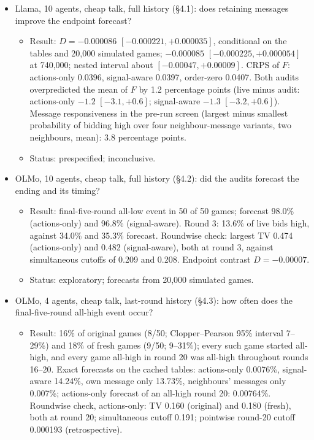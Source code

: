 \documentclass[11pt,letterpaper]{article}
\begin{document}
\begin{itemize}
  \item Llama, 10 agents, cheap talk, full history (§4.1): does retaining messages improve the endpoint forecast?
  \begin{itemize}
    \item Result: $D = -0.000086$ $[-0.000221, +0.000035]$, conditional on the tables and 20,000 simulated games; $-0.000085$ $[-0.000225, +0.000054]$ at 740,000; nested interval about $[-0.00047, +0.00009]$.
      CRPS of $F$: actions-only 0.0396, signal-aware 0.0397, order-zero 0.0407.
      Both audits overpredicted the mean of $F$ by 1.2 percentage points (live minus audit: actions-only $-1.2$ $[-3.1, +0.6]$; signal-aware $-1.3$ $[-3.2, +0.6]$).
      Message responsiveness in the pre-run screen (largest minus smallest probability of bidding high over four neighbour-message variants, two neighbours, mean): 3.8 percentage points.
    \item Status: prespecified; inconclusive.
  \end{itemize}
  \item OLMo, 10 agents, cheap talk, full history (§4.2): did the audits forecast the ending and its timing?
  \begin{itemize}
    \item Result: final-five-round all-low event in 50 of 50 games; forecast 98.0\% (actions-only) and 96.8\% (signal-aware).
      Round 3: 13.6\% of live bids high, against 34.0\% and 35.3\% forecast.
      Roundwise check: largest TV 0.474 (actions-only) and 0.482 (signal-aware), both at round 3, against simultaneous cutoffs of 0.209 and 0.208.
      Endpoint contrast $D = -0.00007$.
    \item Status: exploratory; forecasts from 20,000 simulated games.
  \end{itemize}
  \item OLMo, 4 agents, cheap talk, last-round history (§4.3): how often does the final-five-round all-high event occur?
  \begin{itemize}
    \item Result: 16\% of original games (8/50; Clopper--Pearson 95\% interval 7--29\%) and 18\% of fresh games (9/50; 9--31\%); every such game started all-high, and every game all-high in round 20 was all-high throughout rounds 16--20.
      Exact forecasts on the cached tables: actions-only 0.0076\%, signal-aware 14.24\%, own message only 13.73\%, neighbours' messages only 0.007\%; actions-only forecast of an all-high round 20: 0.00764\%.
      Roundwise check, actions-only: TV 0.160 (original) and 0.180 (fresh), both at round 20; simultaneous cutoff 0.191; pointwise round-20 cutoff 0.000193 (retrospective).

\end{itemize}
\end{itemize}
\end{document}
